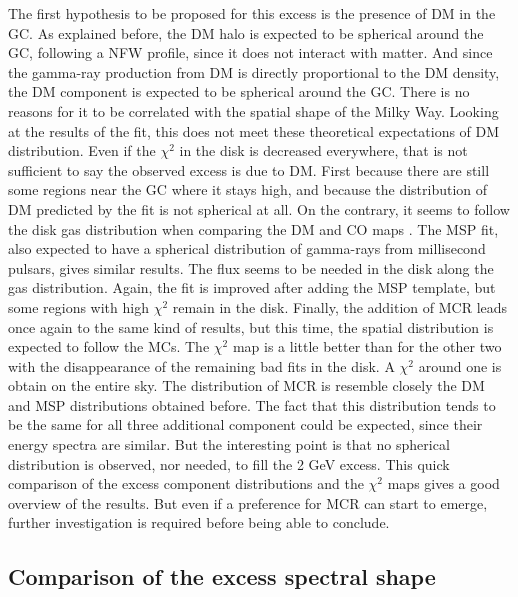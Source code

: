 The first hypothesis to be proposed for this excess is the presence of DM in the GC. As explained before, the DM halo is expected to be spherical around the GC, following a NFW profile, since it does not interact with matter. And since the gamma-ray production from DM is directly proportional to the DM density, the DM component is expected to be spherical around the GC. There is no reasons for it to be correlated with the spatial shape of the Milky Way. Looking at the results of the fit, this does not meet these theoretical expectations of DM distribution. Even if the $\chi^2$ in the disk is decreased everywhere, that is not sufficient to say the observed excess is due to DM. First because there are still some regions near the GC where it stays high, and because the distribution of DM predicted by the fit is not spherical at all. On the contrary, it seems to follow the disk gas distribution when comparing the DM and CO maps .
The MSP fit, also expected to have a spherical distribution of gamma-rays from millisecond pulsars, gives similar results. The flux seems to be needed in the disk along the gas distribution. Again, the fit is improved after adding the MSP template, but some regions with high $\chi^2$ remain in the disk. 
Finally, the addition of MCR leads once again to the same kind of results, but this time, the spatial distribution is expected to follow the MCs. The $\chi^2$ map is a little better than for the other two with the disappearance of the remaining bad fits in the disk. A $\chi^2$ around one is obtain on the entire sky. The distribution of MCR is resemble closely the DM and MSP distributions obtained before. 
The fact that this distribution tends to be the same for all three additional component could be expected, since their energy spectra are similar. But the interesting point is that no spherical distribution is observed, nor needed, to fill the 2 GeV excess.
This quick comparison of the excess component distributions and the $\chi^2$ maps gives a good overview of the results. But even if a preference for MCR can start to emerge, further investigation is required before being able to conclude.


\subsection{Comparison of the excess spectral shape}

